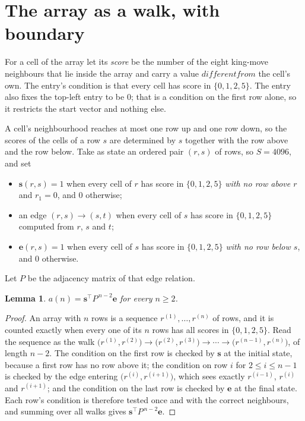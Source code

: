 \documentclass[11pt,a4paper]{article}
\theoremstyle{plain}
\newtheorem{lemma}[theorem]{Lemma}
\theoremstyle{definition}
\begin{document}
\section{The array as a walk, with boundary}

For a cell of the array let its \emph{score} be the number of the eight king-move neighbours that lie inside
the array and carry a value $different from$ the cell's own. The entry's condition is that every cell
has score in $\{0,1,2,5\}$. The entry also fixes the top-left entry to be $0$; that is a condition on the first row alone, so it restricts the start vector and nothing else.

A cell's neighbourhood reaches at most one row up and one row down, so the scores of the
cells of a row $s$ are determined by $s$ together with the row above and the row below.
Take as state an ordered pair $(r,s)$ of rows, so $S=4096$, and set
\begin{itemize}
\item $\mathbf{s}(r,s)=1$ when every cell of $r$ has score in $\{0,1,2,5\}$ \emph{with no row
above $r$} and $r_1=0$, and $0$ otherwise;
\item an edge $(r,s)\to(s,t)$ when every cell of $s$ has score in $\{0,1,2,5\}$ computed from
$r$, $s$ and $t$;
\item $\mathbf{e}(r,s)=1$ when every cell of $s$ has score in $\{0,1,2,5\}$ \emph{with no row
below $s$}, and $0$ otherwise.
\end{itemize}
Let $P$ be the adjacency matrix of that edge relation.

\begin{lemma}\label{lem:walk}
$a(n)=\mathbf{s}^{\!\top}P^{\,n-2}\mathbf{e}$ for every $n\ge2$.
\end{lemma}

\begin{proof}
An array with $n$ rows is a sequence $r^{(1)},\dots,r^{(n)}$ of rows, and it is counted
exactly when every one of its $n$ rows has all scores in $\{0,1,2,5\}$. Read the sequence as the
walk $\bigl(r^{(1)},r^{(2)}\bigr)\to\bigl(r^{(2)},r^{(3)}\bigr)\to\cdots\to
\bigl(r^{(n-1)},r^{(n)}\bigr)$, of length $n-2$. The condition on the first row is
checked by $\mathbf{s}$ at the initial state, because a first row has no row above it; the
condition on row $i$ for $2\le i\le n-1$ is checked by the edge entering
$\bigl(r^{(i)},r^{(i+1)}\bigr)$, which sees exactly $r^{(i-1)}$, $r^{(i)}$ and
$r^{(i+1)}$; and the condition on the last row is checked by $\mathbf{e}$ at the final
state. Each row's condition is therefore tested once and with the correct neighbours, and
summing over all walks gives $\mathbf{s}^{\!\top}P^{\,n-2}\mathbf{e}$.
\end{proof}
\end{document}
